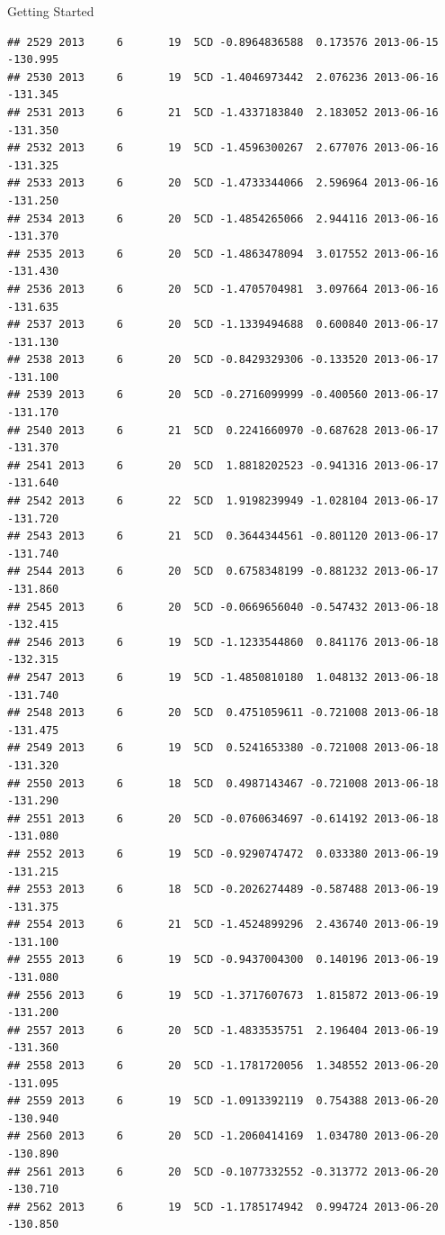 \documentclass[
  ignorenonframetext,
]{beamer}
\begin{document}
\begin{frame}[fragile]{Getting Started}
\begin{verbatim}
## 2529 2013     6       19  5CD -0.8964836588  0.173576 2013-06-15 -130.995
## 2530 2013     6       19  5CD -1.4046973442  2.076236 2013-06-16 -131.345
## 2531 2013     6       21  5CD -1.4337183840  2.183052 2013-06-16 -131.350
## 2532 2013     6       19  5CD -1.4596300267  2.677076 2013-06-16 -131.325
## 2533 2013     6       20  5CD -1.4733344066  2.596964 2013-06-16 -131.250
## 2534 2013     6       20  5CD -1.4854265066  2.944116 2013-06-16 -131.370
## 2535 2013     6       20  5CD -1.4863478094  3.017552 2013-06-16 -131.430
## 2536 2013     6       20  5CD -1.4705704981  3.097664 2013-06-16 -131.635
## 2537 2013     6       20  5CD -1.1339494688  0.600840 2013-06-17 -131.130
## 2538 2013     6       20  5CD -0.8429329306 -0.133520 2013-06-17 -131.100
## 2539 2013     6       20  5CD -0.2716099999 -0.400560 2013-06-17 -131.170
## 2540 2013     6       21  5CD  0.2241660970 -0.687628 2013-06-17 -131.370
## 2541 2013     6       20  5CD  1.8818202523 -0.941316 2013-06-17 -131.640
## 2542 2013     6       22  5CD  1.9198239949 -1.028104 2013-06-17 -131.720
## 2543 2013     6       21  5CD  0.3644344561 -0.801120 2013-06-17 -131.740
## 2544 2013     6       20  5CD  0.6758348199 -0.881232 2013-06-17 -131.860
## 2545 2013     6       20  5CD -0.0669656040 -0.547432 2013-06-18 -132.415
## 2546 2013     6       19  5CD -1.1233544860  0.841176 2013-06-18 -132.315
## 2547 2013     6       19  5CD -1.4850810180  1.048132 2013-06-18 -131.740
## 2548 2013     6       20  5CD  0.4751059611 -0.721008 2013-06-18 -131.475
## 2549 2013     6       19  5CD  0.5241653380 -0.721008 2013-06-18 -131.320
## 2550 2013     6       18  5CD  0.4987143467 -0.721008 2013-06-18 -131.290
## 2551 2013     6       20  5CD -0.0760634697 -0.614192 2013-06-18 -131.080
## 2552 2013     6       19  5CD -0.9290747472  0.033380 2013-06-19 -131.215
## 2553 2013     6       18  5CD -0.2026274489 -0.587488 2013-06-19 -131.375
## 2554 2013     6       21  5CD -1.4524899296  2.436740 2013-06-19 -131.100
## 2555 2013     6       19  5CD -0.9437004300  0.140196 2013-06-19 -131.080
## 2556 2013     6       19  5CD -1.3717607673  1.815872 2013-06-19 -131.200
## 2557 2013     6       20  5CD -1.4833535751  2.196404 2013-06-19 -131.360
## 2558 2013     6       20  5CD -1.1781720056  1.348552 2013-06-20 -131.095
## 2559 2013     6       19  5CD -1.0913392119  0.754388 2013-06-20 -130.940
## 2560 2013     6       20  5CD -1.2060414169  1.034780 2013-06-20 -130.890
## 2561 2013     6       20  5CD -0.1077332552 -0.313772 2013-06-20 -130.710
## 2562 2013     6       19  5CD -1.1785174942  0.994724 2013-06-20 -130.850

\end{verbatim}
\end{frame}
\end{document}
